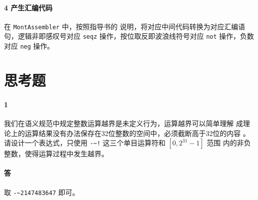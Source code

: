 \documentclass[UTF8]{ctexart}
\newcommand{\T}[1]{\texttt{{#1}}}
\begin{document}
            \paragraph{4 产生汇编代码} 在 \T{MontAssembler} 中，按照指导书的
            说明，将对应中间代码转换为对应汇编语句，逻辑非即感叹号对应
            \T{seqz} 操作，按位取反即波浪线符号对应 \T{not} 操作，负数对应 \T{neg} 操作。
        
    \section{思考题}
        \paragraph{1} 我们在语义规范中规定整数运算越界是未定义行为，运算越界可以简单理解
        成理论上的运算结果没有办法保存在32位整数的空间中，必须截断高于32位的内容
        。请设计一个表达式，只使用 \T{-\textasciitilde!} 这三个单目运算符和 $[0, 2^{31} - 1]$ 范围
        内的非负整数，使得运算过程中发生越界。
        \paragraph{答} 取 \T{-\textasciitilde 2147483647} 即可。
\end{document}
